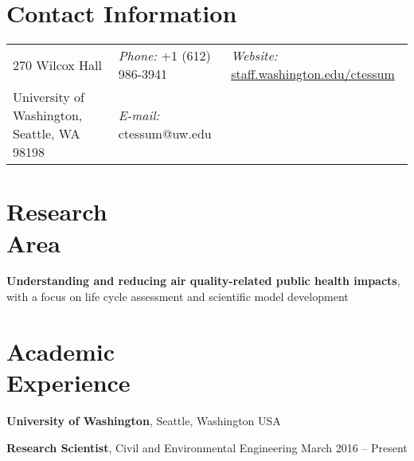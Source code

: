 \documentclass[margin,line,10pt]{res}
\newenvironment{list1}{
  \begin{list}{\ding{113}}{%
      \setlength{\itemsep}{0in}
      \setlength{\parsep}{0in} \setlength{\parskip}{0in}
      \setlength{\topsep}{0in} \setlength{\partopsep}{0in} 
      \setlength{\leftmargin}{0.17in}}}{\end{list}}
\begin{document}
\thispagestyle{empty}

\begin{resume}
\section{\sc Contact Information}
\vspace{.05in}
\begin{tabular}{@{}p{1.6in}p{1.7in}p{2.5in}}
270 Wilcox Hall &
{\it Phone:} +1 (612) 986-3941 & 
{\it Website:} \url{staff.washington.edu/ctessum} \\            
University of Washington, Seattle, WA 98198 &
{\it E-mail:}  ctessum@uw.edu & \\     		    
\end{tabular}

\section{\sc Research\\Area}

\textbf{Understanding and reducing air quality-related public health impacts}, with a focus on life cycle assessment and scientific model development


\section{\sc Academic\\Experience}

\textbf{University of Washington}, Seattle, Washington USA\\

\vspace*{-.1in}

\begin{list1}
\item[] \textbf{Research Scientist}, Civil and Environmental Engineering \hfill March 2016 -- Present\\
\end{list1}

\vspace*{-.2in}


\end{resume}
\end{document}
